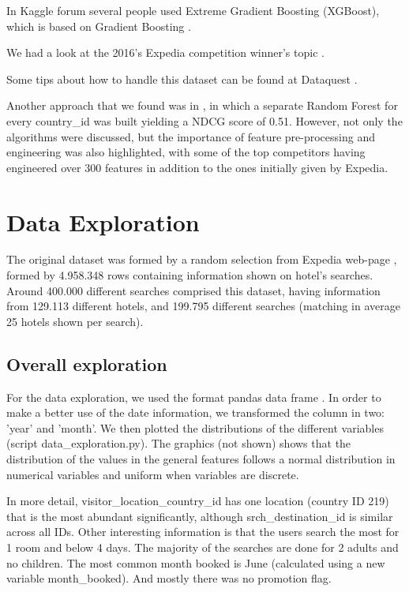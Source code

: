 \documentclass[9pt]{llncs}
\begin{document}
In Kaggle forum \cite{ExpediaHttps://www.kaggle.com/c/expedia-personalized-sort} several people used Extreme Gradient Boosting (XGBoost), which is based on Gradient Boosting \cite{XGB}. 

We had a look at the 2016's Expedia competition winner's topic \cite{Kaggle21607}.

Some tips about how to handle this dataset can be found at Dataquest \cite{Parachuri}.

Another approach that we found was in \cite{AgarwalLearnQueries}, in which a separate Random Forest for every country\_id was built yielding a NDCG score of 0.51.
However, not only the algorithms were discussed, but the importance of feature pre-processing and engineering was also highlighted, with some of the top competitors having engineered over 300 features in addition to the ones initially given by Expedia.

\section{Data Exploration}
The original dataset was formed by a random selection from Expedia web-page \cite{ExpediaHttps://www.kaggle.com/c/expedia-personalized-sort}, formed by 4.958.348 rows containing information shown on hotel's searches. Around 400.000 different searches comprised this dataset, having information from 129.113 different hotels, and 199.795 different searches (matching in average 25 hotels shown per search). 
\subsection{Overall exploration}
For the data exploration, we used the format pandas data frame \cite{McKinney2015PandasToolkit}. In order to make a better use of the date information, we transformed the column in two: 'year' and 'month'.
We then plotted the distributions of the different variables (script data\_exploration.py). The graphics (not shown) shows that the distribution of the values in the general features follows a normal distribution in numerical variables and uniform when variables are discrete.


In more detail, visitor\_location\_country\_id has one location (country ID 219) that is the most abundant significantly, although srch\_destination\_id is similar across all IDs. Other interesting information is that the users search the most for 1 room and below 4 days. The majority of the searches are done for 2 adults and no children. The most common month booked is June (calculated using a new variable month\_booked). And mostly there was no promotion flag.
\end{document}
